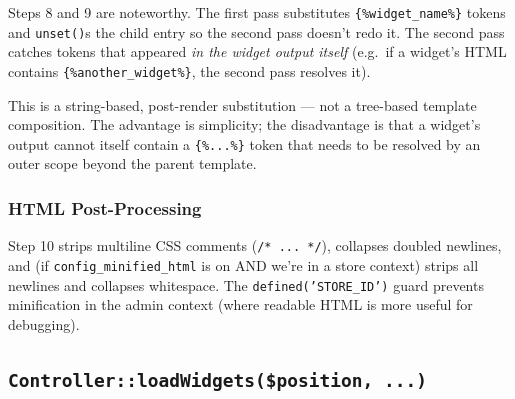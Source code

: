 \documentclass[11pt,a4paper]{article}
\begin{document}
Steps 8 and 9 are noteworthy. The first pass substitutes
\texttt{\{\%widget\_name\%\}} tokens and \texttt{unset()}s the
child entry so the second pass doesn't redo it. The second pass
catches tokens that appeared \emph{in the widget output itself}
(e.g.\ if a widget's HTML contains \texttt{\{\%another\_widget\%\}},
the second pass resolves it).

This is a string-based, post-render substitution --- not a
tree-based template composition. The advantage is simplicity; the
disadvantage is that a widget's output cannot itself contain a
\texttt{\{\%...\%\}} token that needs to be resolved by an outer
scope beyond the parent template.

\subsubsection{HTML Post-Processing}

Step 10 strips multiline CSS comments (\texttt{/* ... */}),
collapses doubled newlines, and (if
\texttt{config\_minified\_html} is on AND we're in a store
context) strips all newlines and collapses whitespace. The
\texttt{defined('STORE\_ID')} guard prevents minification in
the admin context (where readable HTML is more useful for
debugging).

\subsection{\texttt{Controller::loadWidgets(\$position, ...)}}
\end{document}
